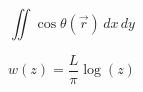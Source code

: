 \documentclass[12pt]{article}
\begin{document}
\begin{displaymath}
\iint\cos\theta(\vec r) \,dx \,dy 
\end{displaymath}

\newpage

\begin{displaymath}
w(z) = \frac{L}{\pi} \log(z)
\end{displaymath}
\end{document}

